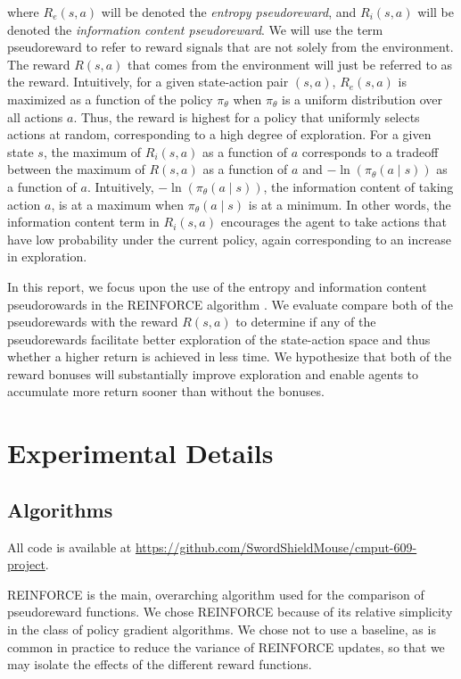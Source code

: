 \documentclass{article}
\begin{document}
  where $R_e(s, a)$ will be denoted the \textit{entropy pseudoreward}, and $R_i(s, a)$ will be denoted the \textit{information content pseudoreward}. We will use the term pseudoreward to refer to reward signals that are not solely from the environment. The reward $R(s, a)$ that comes from the environment will just be referred to as the reward. Intuitively, for a given state-action pair $(s, a)$, $R_e(s, a)$ is maximized as a function of the policy $\pi_\theta$ when $\pi_\theta$ is a uniform distribution over all actions $a$. Thus, the reward is highest for a policy that uniformly selects actions at random, corresponding to a high degree of exploration. For a given state $s$, the maximum of $R_i(s, a)$ as a function of $a$ corresponds to a tradeoff between the maximum of $R(s, a)$ as a function of $a$ and $- \ln\left(\pi_\theta(a \mid s)\right)$ as a function of $a$. Intuitively, $- \ln\left(\pi_\theta(a \mid s)\right)$, the information content of taking action $a$, is at a maximum when $\pi_\theta(a \mid s)$ is at a minimum. In other words, the information content term in $R_i(s, a)$ encourages the agent to take actions that have low probability under the current policy, again corresponding to an increase in exploration.

  In this report, we focus upon the use of the entropy and information content pseudorowards in the REINFORCE algorithm \citep{williams1992simple}. We evaluate compare both of the pseudorewards with the reward $R(s, a)$ to determine if any of the pseudorewards facilitate better exploration of the state-action space and thus whether a higher return is achieved in less time. We hypothesize that both of the reward bonuses will substantially improve exploration and enable agents to accumulate more return sooner than without the bonuses.

  \section{Experimental Details}
  \subsection{Algorithms}
  All code is available at \url{https://github.com/SwordShieldMouse/cmput-609-project}.

  REINFORCE is the main, overarching algorithm used for the comparison of pseudoreward functions. We chose REINFORCE because of its relative simplicity in the class of policy gradient algorithms. We chose not to use a baseline, as is common in practice to reduce the variance of REINFORCE updates, so that we may isolate the effects of the different reward functions.
\end{document}
